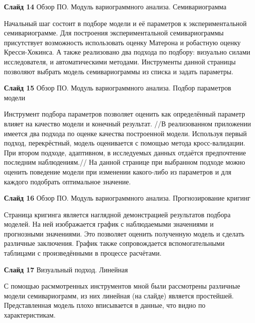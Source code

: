 \documentclass[a4paper,10pt]{report}
\begin{document}
\textbf{Слайд 14} Обзор ПО. Модуль вариограммного анализа. Семивариограмма

Начальный шаг состоит в подборе модели и её параметров к экспериментальной семивариограмме. Для построения экспериментальной семивариограммы присутствует возможность использовать оценку Матерона и робастную оценку Кресси-Хокинса. А также реализовано два подхода по подбору: визуально силами исследователя, и автоматическими методами. Инструменты данной страницы позволяют выбрать модель семивариограммы из списка и задать параметры.

\textbf{Слайд 15} Обзор ПО. Модуль вариограммного анализа. Подбор параметров модели

Инструмент подбора параметров позволяет оценить как определённый параметр влияет на качество модели и конечный результат. //В реализованном приложении имеется два подхода по оценке качества построенной модели. Используя первый подход, перекрёстный, модель оценивается с помощью метода кросс-валидации. При втором подходе, адаптивном, в исследуемых данных отдаётся предпочтение последним наблюдениям.// На данной странице при выбранном подходе можно оценить поведение модели при изменении какого-либо из параметров и для каждого подобрать оптимальное значение.

\textbf{Слайд 16} Обзор ПО. Модуль вариограммного анализа. Прогнозирование кригинг

Страница кригинга является наглядной демонстрацией результатов подбора моделей. На ней изображается график с наблюдаемыми значениями и прогнозными значениями. Это позволяет оценить полученную модель и сделать различные заключения. График также сопровождается вспомогательными таблицами с произведёнными в процессе расчётами.

\textbf{Слайд 17} Визуальный подход. Линейная

С помощью расммотренных инструментов мной были рассмотрены различные модели семивариограмм, из них линейная (на слайде) является простейшей. Представленная модель плохо вписывается в данные, что видно по характеристикам.


\end{document}
